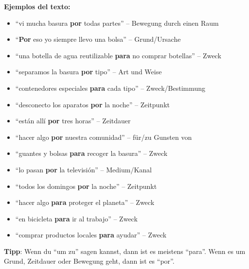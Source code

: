 \documentclass[12pt,a4paper]{article}
\begin{document}
\textbf{Ejemplos del texto:}
\begin{itemize}[leftmargin=*]
    \item \enquote{vi mucha basura \textbf{por} todas partes} -- Bewegung durch einen Raum
    \item \enquote{\textbf{Por} eso yo siempre llevo una bolsa} -- Grund/Ursache
    \item \enquote{una botella de agua reutilizable \textbf{para} no comprar botellas} -- Zweck
    \item \enquote{separamos la basura \textbf{por} tipo} -- Art und Weise
    \item \enquote{contenedores especiales \textbf{para} cada tipo} -- Zweck/Bestimmung
    \item \enquote{desconecto los aparatos \textbf{por} la noche} -- Zeitpunkt
    \item \enquote{están allí \textbf{por} tres horas} -- Zeitdauer
    \item \enquote{hacer algo \textbf{por} nuestra comunidad} -- für/zu Gunsten von
    \item \enquote{guantes y bolsas \textbf{para} recoger la basura} -- Zweck
    \item \enquote{lo pasan \textbf{por} la televisión} -- Medium/Kanal
    \item \enquote{todos los domingos \textbf{por} la noche} -- Zeitpunkt
    \item \enquote{hacer algo \textbf{para} proteger el planeta} -- Zweck
    \item \enquote{en bicicleta \textbf{para} ir al trabajo} -- Zweck
    \item \enquote{comprar productos locales \textbf{para} ayudar} -- Zweck
\end{itemize}

\textbf{Tipp}: Wenn du \enquote{um zu} sagen kannst, dann ist es meistens \enquote{para}. Wenn es um Grund, Zeitdauer oder Bewegung geht, dann ist es \enquote{por}.
\end{document}
